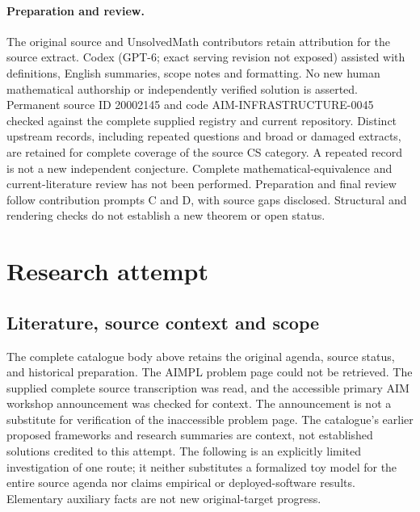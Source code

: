 \documentclass[11pt]{article}
\begin{document}
\paragraph{Preparation and review.}
The original source and UnsolvedMath contributors retain attribution for the source extract. Codex (GPT-6; exact serving revision not exposed) assisted with definitions, English summaries, scope notes and formatting. No new human mathematical authorship or independently verified solution is asserted. Permanent source ID 20002145 and code AIM-INFRASTRUCTURE-0045 checked against the complete supplied registry and current repository. Distinct upstream records, including repeated questions and broad or damaged extracts, are retained for complete coverage of the source CS category. A repeated record is not a new independent conjecture. Complete mathematical-equivalence and current-literature review has not been performed. Preparation and final review follow contribution prompts C and D, with source gaps disclosed. Structural and rendering checks do not establish a new theorem or open status.
\label{end:20002145}

\section{Research attempt}
\subsection{Literature, source context and scope}
The complete catalogue body above retains the original agenda, source status, and historical preparation. The AIMPL problem page could not be retrieved. The supplied complete source transcription was read, and the accessible primary AIM workshop announcement was checked for context. The announcement is not a substitute for verification of the inaccessible problem page. The catalogue's earlier proposed frameworks and research summaries are context, not established solutions credited to this attempt. The following is an explicitly limited investigation of one route; it neither substitutes a formalized toy model for the entire source agenda nor claims empirical or deployed-software results. Elementary auxiliary facts are not new original-target progress.
\end{document}
